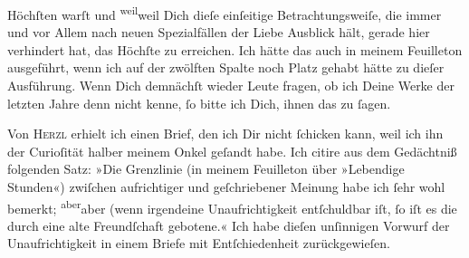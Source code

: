                Höchſten warſt und \substVorne{}\textsuperscript{weil}\substDazwischen{}weil\substHinten{} Dich dieſe einſeitige Betrachtungsweiſe, die immer und {\pb}vor Allem nach 
               neuen Spezialfällen der Liebe Ausblick hält, gerade hier verhindert hat, das Höchſte
               zu erreichen. Ich hätte das auch in meinem Feuilleton ausgeführt, wenn ich auf der zwölften Spalte
               noch Platz gehabt hätte zu dieſer Ausführung. Wenn Dich demnächſt wieder Leute
               fragen, ob ich Deine Werke der letzten Jahre denn nicht kenne, ſo bitte ich Dich,
               ihnen das zu ſagen.\pend
           
\pstart
           Von \textsc{Herzl} erhielt ich einen Brief, den ich Dir nicht ſchicken kann, weil ich ihn der
               Curioſität halber meinem Onkel geſandt habe. Ich citire aus dem Gedächtniß folgenden Satz: »Die
               Grenzlinie (in meinem Feuilleton über »Lebendige Stunden«)
               zwiſchen aufrichtiger und geſchriebener Meinung {\pb}habe ich ſehr wohl bemerkt; \substVorne{}\textsuperscript{aber}\substDazwischen{}aber\substHinten{} (wenn irgendeine Unaufrichtigkeit entſchuldbar iſt, ſo iſt es die durch eine
               alte Freundſchaft gebotene.« Ich habe dieſen unſinnigen Vorwurf der Unaufrichtigkeit
                  \introOben{}in einem
                  Briefe\introOben{}
               mit Entſchiedenheit zurückgewieſen.\pend
           
